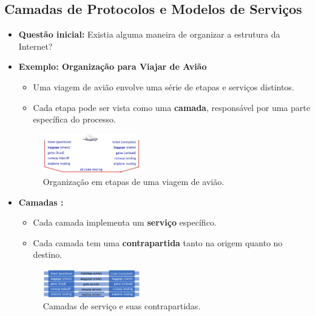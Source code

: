     \subsection{Camadas de Protocolos e Modelos de Serviços}

    \begin{itemize}[left=0.5cm, align=left, nosep]
        \item \textbf{Questão inicial:} Existia alguma maneira de organizar a estrutura da Internet?
        \item \textbf{Exemplo: Organização para Viajar de Avião} 
            \begin{itemize}[left=0.5cm, nosep, label=$\hookrightarrow$]
                \item Uma viagem de avião envolve uma série de etapas e serviços distintos.
                \item Cada etapa pode ser vista como uma \textbf{camada}, responsável por uma parte específica do processo.
            \end{itemize} 
        
        \begin{figure}[H]
            \centering
            \includegraphics[width=0.4\textwidth]{img/cap-01/exemplo-aviao.png}
            \caption{Organização em etapas de uma viagem de avião.}
        \end{figure}

        \item \textbf{Camadas :}
            \begin{itemize}[left=0.5cm, nosep, label=$\hookrightarrow$]
                \item Cada camada implementa um \textbf{serviço} específico.
                \item Cada camada tem uma \textbf{contrapartida} tanto na origem quanto no destino.
            \end{itemize} 
    
        \begin{figure}[H]
            \centering
            \includegraphics[width=0.4\textwidth]{img/cap-01/exemplo-aviao2.png}
            \caption{Camadas de serviço e suas contrapartidas.}
        \end{figure}


\end{itemize}
